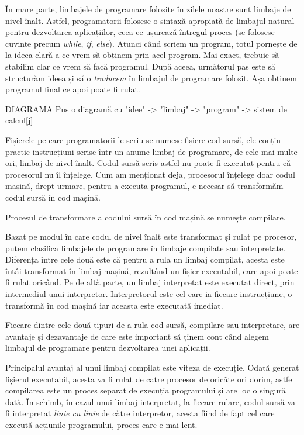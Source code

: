 În mare parte, limbajele de programare folosite în zilele noastre sunt limbaje
de nivel înalt. Astfel, programatorii folosesc o sintaxă apropiată de limbajul
natural pentru dezvoltarea aplicațiilor, ceea ce ușurează întregul proces (se
folosesc cuvinte precum \textit{while}, \textit{if}, \textit{else}). Atunci
când scriem un program, totul pornește de la ideea clară a ce vrem să obținem
prin acel program. Mai exact, trebuie să stabilim clar ce vrem să facă
programul. După aceea, următorul pas este să structurăm ideea și să o
\textit{traducem} în limbajul de programare folosit. Așa obținem programul final
ce apoi poate fi rulat.

DIAGRAMA Pus o diagramă cu "idee" -> "limbaj" -> "program" -> sistem de calcul[j]

Fișierele pe care programatorii le scriu se numesc fișiere cod sursă, ele conțin
practic instrucțiuni scrise într-un anume limbaj de programare, de cele mai
multe ori, limbaj de nivel înalt. Codul sursă scris astfel nu poate fi executat
pentru că procesorul nu îl înțelege. Cum am menționat deja, procesorul înțelege
doar codul mașină, drept urmare, pentru a executa programul, e necesar să
transformăm codul sursă în cod mașină.

Procesul de transformare a codului sursă în cod mașină se numește compilare.

Bazat pe modul în care codul de nivel înalt este transformat și rulat pe
procesor, putem clasifica limbajele de programare în limbaje compilate sau
interpretate. Diferența între cele două este că pentru a rula un limbaj
compilat, acesta este întâi transformat în limbaj mașină, rezultând un fișier
executabil, care apoi poate fi rulat oricând. Pe de altă parte, un limbaj
interpretat este executat direct, prin intermediul unui interpretor.
Interpretorul este cel care ia fiecare instrucțiune, o transformă în cod mașină
iar aceasta este executată imediat.

Fiecare dintre cele două tipuri de a rula cod sursă, compilare sau interpretare,
are avantaje și dezavantaje de care este important să ținem cont când alegem
limbajul de programare pentru dezvoltarea unei aplicații.

Principalul avantaj al unui limbaj compilat este viteza de execuție. Odată
generat fișierul executabil, acesta va fi rulat de către procesor de oricâte ori
dorim, astfel compilarea este un proces separat de execuția programului și are
loc o singură dată. În schimb, în cazul unui limbaj interpretat, la fiecare
rulare, codul sursă va fi interpretat \textit{linie cu linie} de către
interpretor, acesta fiind de fapt cel care execută acțiunile programului, proces
care e mai lent.

